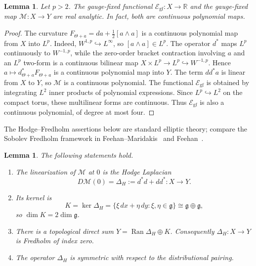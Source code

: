 \documentclass[11pt]{article}
\newtheorem{lemma}[theorem]{Lemma}
\theoremstyle{definition}
\theoremstyle{remark}
\begin{document}
\begin{lemma}\label{lem:YM-analytic}
Let $p>2$. The gauge-fixed functional $\mathcal E_{\mathrm{gf}}:X\to\mathbb R$ and the gauge-fixed map $\mathcal M:X\to Y$ are real analytic. In fact, both are continuous polynomial maps.
\end{lemma}

\begin{proof}
The curvature $F_{\Theta+a}=da+\frac12[a\wedge a]$ is a continuous polynomial map from $X$ into $L^p$. Indeed, $W^{1,p}\hookrightarrow L^\infty$, so $[a\wedge a]\in L^p$. The operator $d^*$ maps $L^p$ continuously to $W^{-1,p}$, while the zero-order bracket contraction involving $a$ and an $L^p$ two-form is a continuous bilinear map $X\times L^p\to L^p\hookrightarrow W^{-1,p}$. Hence $a\mapsto d_{\Theta+a}^*F_{\Theta+a}$ is a continuous polynomial map into $Y$. The term $dd^*a$ is linear from $X$ to $Y$, so $\mathcal M$ is a continuous polynomial. The functional $\mathcal E_{\mathrm{gf}}$ is obtained by integrating $L^2$ inner products of polynomial expressions. Since $L^p\hookrightarrow L^2$ on the compact torus, these multilinear forms are continuous. Thus $\mathcal E_{\mathrm{gf}}$ is also a continuous polynomial, of degree at most four.
\end{proof}

The Hodge--Fredholm assertions below are standard elliptic theory; compare the Sobolev Fredholm framework in Feehan--Maridakis~\cite{FeehanMaridakisMemoirs} and Feehan~\cite{Feehan2022}.

\begin{lemma}\label{lem:YM-Hodge}
The following statements hold.
\begin{enumerate}
\item The linearization of $\mathcal M$ at $0$ is the Hodge Laplacian
$$D\mathcal M(0)=\Delta_H:=d^*d+dd^*:X\to Y.$$
\item Its kernel is
$$
K=\ker\Delta_H
=\{\xi\,dx+\eta\,dy:\xi,\eta\in\mathfrak g\}
\cong\mathfrak g\oplus\mathfrak g,
$$
so $\dim K=2\dim\mathfrak g$.
\item There is a topological direct sum $Y=\operatorname{Ran}\Delta_H\oplus K$. Consequently $\Delta_H:X\to Y$ is Fredholm of index zero.
\item The operator $\Delta_H$ is symmetric with respect to the distributional pairing.
\end{enumerate}
\end{lemma}
\end{document}
